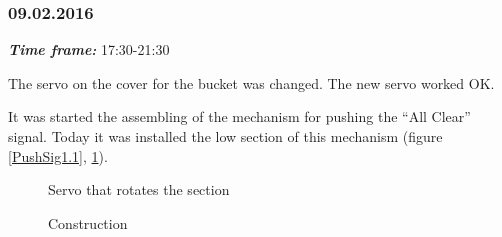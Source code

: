 \subsubsection{09.02.2016}
\textit{\textbf{Time frame:}} 17:30-21:30 

The servo on the cover for the bucket was changed. The new servo worked OK.

It was started the assembling of the mechanism for pushing the “All Clear” signal. Today it was installed the low section of this mechanism (figure \ref{PushSig1.1}, \ref{PushSig1.2}).

\begin{figure}[H]
	\begin{minipage}[h]{0.47\linewidth}
		\caption{Servo that rotates the section}
		\label{PushSig1.1}
	\end{minipage}
	\hfill
	\begin{minipage}[h]{0.47\linewidth}
		\caption{Construction}
		\label{PushSig1.2}
	\end{minipage}
\end{figure}
